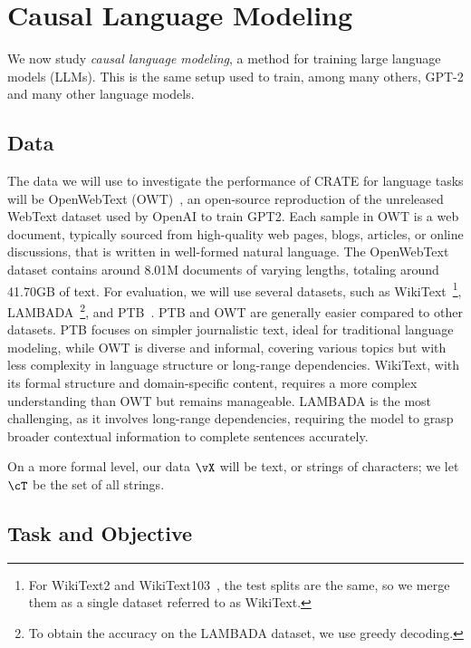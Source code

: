 \documentclass[../../book-main.tex]{subfiles}
\begin{document}
\section{Causal Language Modeling}\label{sec:clm_text}

We now study \textit{causal language modeling}, a method for training large language models (LLMs). This is the same setup used to train, among many others, GPT-2 and many other language models. 

\subsection{Data} \label{sub:clm_text_data}

The data we will use to investigate the performance of CRATE for language tasks will be OpenWebText (OWT)~\cite{Gokaslan2019OpenWeb}, an open-source reproduction of the unreleased WebText dataset used by OpenAI to train GPT2. Each sample in OWT is a web document, typically sourced from high-quality web pages, blogs, articles, or online discussions, that is written in well-formed natural language. The OpenWebText dataset contains around 8.01M documents of varying lengths, totaling around 41.70GB of text. For evaluation, we will use several datasets, such as WikiText~\cite{merity2016pointer}\footnote{For WikiText2 and WikiText103~\cite{merity2016pointer}, the test splits are the same, so we merge them as a single dataset referred to as WikiText.}, LAMBADA~\cite{paperno2016lambadadatasetwordprediction}\footnote{To obtain the accuracy on the LAMBADA dataset, we use greedy decoding.}, and PTB~\cite{marcus-etal-1993-building}. PTB and OWT are generally easier compared to other datasets. PTB focuses on simpler journalistic text, ideal for traditional language modeling, while OWT is diverse and informal, covering various topics but with less complexity in language structure or long-range dependencies. WikiText, with its formal structure and domain-specific content, requires a more complex understanding than OWT but remains manageable. LAMBADA is the most challenging, as it involves long-range dependencies, requiring the model to grasp broader contextual information to complete sentences accurately. 

On a more formal level, our data \(\vX\) will be text, or strings of characters; we let \(\cT\) be the set of all strings.

\subsection{Task and Objective} \label{sub:clm_text_objective}
\end{document}
